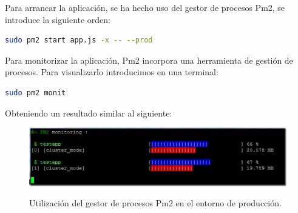 Para arrancar la aplicación, se ha hecho uso del gestor de procesos Pm2, se introduce la siguiente orden: \\

\begin{lstlisting}[language=bash]
  sudo pm2 start app.js -x -- --prod
\end{lstlisting}


Para monitorizar la aplicación, Pm2 incorpora una herramienta de gestión de procesos. Para visualizarlo introducimos en una terminal:\\

\begin{lstlisting}[language=bash]
  sudo pm2 monit
\end{lstlisting}


Obteniendo un resultado similar al siguiente:

\begin{figure}[H]
  \begin{center}
    \includegraphics[scale=0.8]{imagenes/pm2-monit.jpg}\\
    \caption{Utilización del gestor de procesos Pm2 en el entorno de producción.}
  \end{center}
\end{figure}






